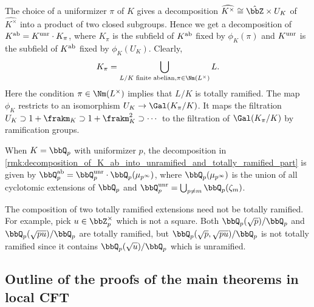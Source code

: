   \begin{remark}\label{rmk:decomposition_of_K_ab_into_unramified_and_totally_ramified_part}
    The choice of a uniformizer $\pi$ of $K$ gives a decomposition $\widehat{K^\times} \cong \hat{\bbZ} \times U_K$ of $\widehat{K^\times}$ into a product of two closed subgroups.
    Hence we get a decomposition of $K^{\text{ab}} = K^{\mathrm{unr}} \cdot K_\pi$, where $K_\pi$ is the subfield of $K^{\text{ab}}$ fixed by $\phi_K(\pi)$ and $K^{\mathrm{unr}}$ is the subfield of $K^{\text{ab}}$ fixed by $\phi_K(U_K)$.
    Clearly, 
    \[ K_\pi = \bigcup_{L/K \text{ finite abelian}, \pi \in \Nm(L^\times)} L. \]
    Here the condition $\pi \in \Nm(L^\times)$ implies that $L/K$ is totally ramified.
    The map $\phi_K$ restricts to an isomorphism $U_K \to \Gal(K_\pi/K)$.
    It maps the filtration $U_K \supset 1 + \frakm_K \supset 1 + \frakm_K^2 \supset \cdots$ to the filtration of $\Gal(K_\pi/K)$ by ramification groups.
  \end{remark}

  \begin{example}
    When $K = \bbQ_p$ with uniformizer $p$, the decomposition in \cref{rmk:decomposition_of_K_ab_into_unramified_and_totally_ramified_part} is given by $\bbQ_p^\ab = \bbQ_p^\unr \cdot \bbQ_p(\mu_{p^\infty})$, where $\bbQ_p(\mu_{p^\infty})$ is the union of all cyclotomic extensions of $\bbQ_p$ and $\bbQ_p^\unr = \bigcup_{p \neq m} \bbQ_p(\zeta_m)$.
  \end{example}

  \begin{remark}
    The composition of two totally ramified extensions need not be totally ramified.
    For example, pick $u \in \bbZ_p^\times$ which is not a square.
    Both $\bbQ_p(\sqrt{p})/\bbQ_p$ and $\bbQ_p(\sqrt{pu})/\bbQ_p$ are totally ramified, but $\bbQ_p(\sqrt{p}, \sqrt{pu})/\bbQ_p$ is not totally ramified since it contains $\bbQ_p(\sqrt{u})/\bbQ_p$ which is unramified.
  \end{remark}


\subsection{Outline of the proofs of the main theorems in local CFT}

